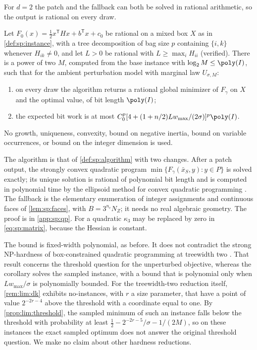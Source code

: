 For $d=2$ the patch and the fallback can both be solved in rational
arithmetic, so the output is rational on every draw.

\begin{corollary}\label{cor:sp:qp}
Let $F_0(x)=\frac12x^{\mathsf T}Hx+b^{\mathsf T}x+c_0$ be rational on a mixed
box $X$ as in \cref{def:sp:instance}, with a tree decomposition of bag size
$p$ containing $\{i,k\}$ whenever $H_{ik}\ne0$, and let $L>0$ be rational
with $L\ge\max_iH_{ii}$ (verified). There is a power of two $M$, computed
from the base instance with $\log_2M\le\poly(I)$, such that for the ambient
perturbation model with marginal law $U_{\sigma,M}$:
\begin{enumerate}[label=(\roman*)]
\item on every draw the algorithm returns a rational global minimizer of
$F_\gamma$ on $X$ and the optimal value, of bit length $\poly(I)$;
\item the expected bit work is at most
$C_0^p[4+(1+n/2)Lw_{\max}/(2\sigma)]^p\poly(I)$.
\end{enumerate}
No growth, uniqueness, convexity, bound on negative inertia, bound on variable
occurrences, or bound on the integer dimension is used.
\end{corollary}

The algorithm is that of \cref{def:sp:algorithm} with two changes. After a
patch output, the strongly convex quadratic program
$\min\{F_\gamma(\bar x_S,y):y\in P\}$ is solved exactly; its unique solution
is rational of polynomial bit length and is computed in polynomial time by
the ellipsoid method for convex quadratic programming
\citep{kozlov1980-the-polynomial-solvability-of-convex}. The fallback is the elementary
enumeration of integer assignments and continuous faces of
\cref{lem:sp:faces}, with $B=3^{n_c}N_Z$; it needs no real algebraic
geometry. The proof is in \cref{app:sp:qp}. For a quadratic $\kappa_3$ may be
replaced by zero in \eqref{eq:sp:matrix}, because the Hessian is constant.

The bound is fixed-width polynomial, as before. It does not contradict the
strong NP-hardness of box-constrained quadratic programming at treewidth two
\citep{pia2026-treewidth-and-the-complexity-of}. That result concerns the
threshold question for the unperturbed objective, whereas the corollary
solves the sampled instance, with a bound that is polynomial only when
$Lw_{\max}/\sigma$ is polynomially bounded. For the treewidth-two reduction
itself, \cref{rem:lim:dk} exhibits no-instances, with $r$ a size
parameter, that have a point of value $2^{-2r-4}$ above the threshold with
a coordinate equal to one. By \cref{prop:lim:threshold}, the sampled minimum
of such an instance falls below the threshold with probability at least
$\frac12-2^{-2r-5}/\sigma-1/(2M)$, so on these instances the exact sampled
optimum does not answer the original threshold question. We make no claim
about other hardness reductions.

